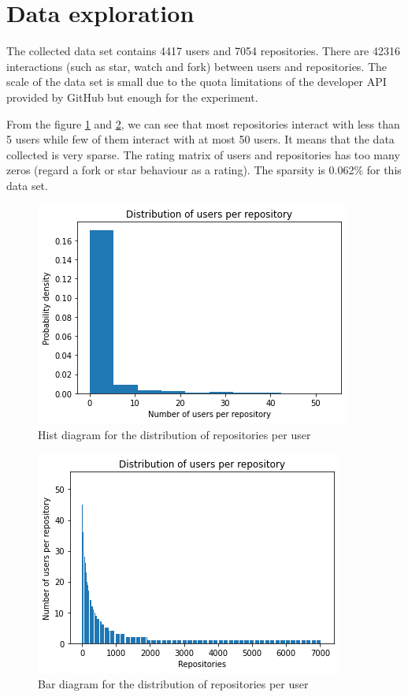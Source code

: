\documentclass[11pt,twoside]{report}
\begin{document}
\section{Data exploration}
The collected data set contains 4417 users and 7054 repositories. There are 42316 interactions (such as star, watch and fork) between users and repositories. The scale of the data set is small due to the quota limitations of the developer API provided by GitHub but enough for the experiment.

From the figure \ref{fig:user_repo_dist_hist} and \ref{fig:user_repo_dist_bar}, we can see that most repositories interact with less than 5 users while few of them interact with at most 50 users. It means that the data collected is very sparse. The rating matrix of users and repositories has too many zeros (regard a fork or star behaviour as a rating). The sparsity is 0.062\% for this data set.

\begin{figure}[H]
    \centering
    \includegraphics[scale=0.9]{user_repo_dist_hist.png}
    \caption{Hist diagram for the distribution of repositories per user}
    \label{fig:user_repo_dist_hist}
\end{figure}

\begin{figure}[H]
    \centering
    \includegraphics[scale=0.9]{user_repo_dist_bar.png}
    \caption{Bar diagram for the distribution of repositories per user}
    \label{fig:user_repo_dist_bar}
\end{figure}
\end{document}
